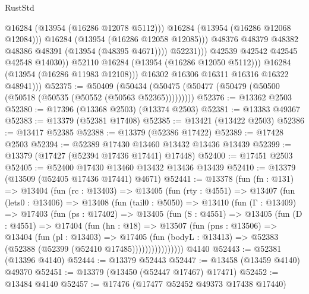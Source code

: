 \begin{lexlean}{RustStd}
\begin{coremodule}
                                  @16284
                                  (@13954 (@16286 @12078 @5112)))
                                @16284
                                (@13954 (@16286 @12068 @12084)))
                              @16284
                              (@13954 (@16286 @12058 @12085)))
                            @48376
                            @48379
                            @48382
                            @48386
                            @48391
                            (@13954 (@48395 @4671))))
                        @52231)))
                  @42539
                  @42542
                  @42545
                  @42548
                  @14030))
              @52110
              @16284
              (@13954 (@16286 @12050 @5112)))
            @16284
            (@13954 (@16286 @11983 @12108)))
          @16302
          @16306
          @16311
          @16316
          @16322
          @48941)))
@52375 := @50409
    (@50434 (@50475 (@50477 (@50479 (@50500 (@50518 (@50535 (@50552 (@50563 @52365)))))))))
@52376 := @13362 @2503
@52380 := @17396 (@13368 @2503) (@13374 @2503)
@52381 := @13383 @49367
@52383 := @13379 (@52381 @17408)
@52385 := @13421 (@13422 @2503)
@52386 := @13417 @52385
@52388 := @13379 (@52386 @17422)
@52389 := @17428 @2503
@52394 := @52389 @17430 @13460 @13432 @13436 @13439
@52399 := @13379 (@17427 (@52394 @17436 @17441) @17448)
@52400 := @17451 @2503
@52405 := @52400 @17430 @13460 @13432 @13436 @13439
@52410 := @13379 (@13509 (@52405 @17436 @17441) @4671)
@52441 := @13378
    (fun (fn : @131) =>
    @13404
      (fun (rc : @13403) =>
      @13405
        (fun (rty : @4551) =>
        @13407
          (fun (lets0 : @13406) =>
          @13408
            (fun (tail0 : @5050) =>
            @13410
              (fun (Γ : @13409) =>
              @17403
                (fun (ps : @17402) =>
                @13405
                  (fun (S : @4551) =>
                  @13405
                    (fun (D : @4551) =>
                    @17404
                      (fun (hn : @18) =>
                      @13507
                        (fun (pns : @13506) =>
                        @13404
                          (fun (pl : @13403) =>
                          @17405
                            (fun (bodyL : @13413) =>
                            @52383 (@52388 (@52399 (@52410 @17485))))))))))))))))
    @4140
@52443 := @52381 (@13396 @4140)
@52444 := @13379 @52443
@52447 := @13458 (@13459 @4140) @49370
@52451 := @13379 (@13450 (@52447 @17467) @17471)
@52452 := @13484 @4140
@52457 := @17476 (@17477 @52452 @49373 @17438 @17440)

\end{coremodule}
\end{lexlean}
